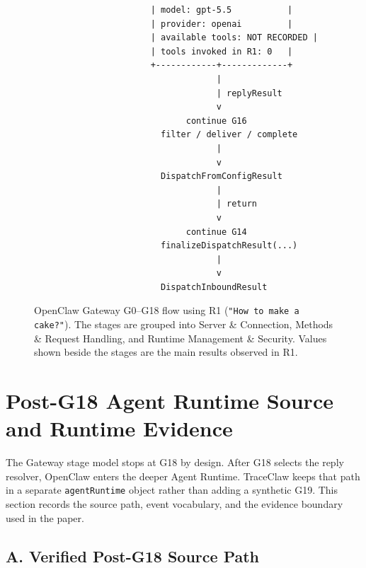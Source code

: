 \begin{figure}[p]
\begin{verbatim}
                       | model: gpt-5.5           |
                       | provider: openai         |
                       | available tools: NOT RECORDED |
                       | tools invoked in R1: 0   |
                       +------------+-------------+
                                    |
                                    | replyResult
                                    v
                              continue G16
                         filter / deliver / complete
                                    |
                                    v
                         DispatchFromConfigResult
                                    |
                                    | return
                                    v
                              continue G14
                         finalizeDispatchResult(...)
                                    |
                                    v
                         DispatchInboundResult

\end{verbatim}
\endgroup

\caption{
OpenClaw Gateway G0--G18 flow using R1
(\texttt{"How to make a cake?"}).
The stages are grouped into Server \& Connection,
Methods \& Request Handling, and Runtime Management \& Security.
Values shown beside the stages are the main results observed in R1.
}

\label{fig:gateway-g0-g18-r1}

\end{figure}

\clearpage
\section{Post-G18 Agent Runtime Source and Runtime Evidence}
\label{app:post-g18-runtime}

The Gateway stage model stops at G18 by design. After G18 selects the
reply resolver, OpenClaw enters the deeper Agent Runtime. TraceClaw keeps
that path in a separate \texttt{agentRuntime} object rather than adding a
synthetic G19. This section records the source path, event vocabulary,
and the evidence boundary used in the paper.

\subsection*{A. Verified Post-G18 Source Path}

